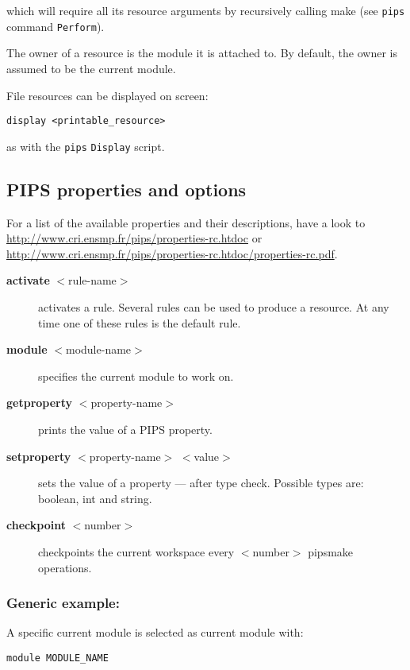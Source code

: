 \documentclass[a4paper,12pt]{article}
\newcommand{\PipsPIPSpropertiesPDF}{\url{http://www.cri.ensmp.fr/pips/properties-rc.htdoc/properties-rc.pdf}\xspace}
\newcommand{\PipsPIPSpropertiesHTDOC}{\url{http://www.cri.ensmp.fr/pips/properties-rc.htdoc}\xspace}
\begin{document}
which will require all its resource arguments by recursively
calling make (see \texttt{pips} command \texttt{Perform}).

The owner of a resource is the module it is attached to. By
default, the owner is assumed to be the current module.

File resources can be displayed on screen:

{\bf
\begin{verbatim}
display <printable_resource> 
\end{verbatim}
}
as with the \texttt{pips} \texttt{Display} script.


\subsection{PIPS properties and options}

For a list of the available properties and their descriptions, have a look
to \PipsPIPSpropertiesHTDOC or \PipsPIPSpropertiesPDF.

\begin{description}
\item[{\bf activate} $<$rule-name$>$] activates a rule. Several rules
  can be used to produce a resource. At any time one of these rules is the
  default rule.

\item[{\bf module} $<$module-name$>$] specifies the current module to
  work on.

\item[{\bf getproperty} $<$property-name$>$] prints the value of a PIPS
  property.

\item[{\bf setproperty} $<$property-name$>$ $<$value$>$] sets the value
  of a property --- after type check. Possible types are: boolean, int and
  string.

\item[{\bf checkpoint} $<$number$>$] checkpoints the current workspace
  every $<$number$>$ pipsmake operations.

\end{description}
 
\subsubsection*{Generic example:}

A specific current module is selected as current module with:
{\bf
\begin{verbatim}
module MODULE_NAME
\end{verbatim}
}
\end{document}
